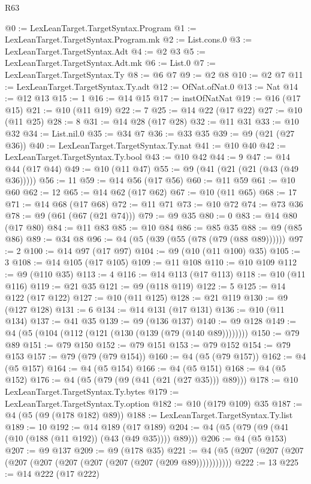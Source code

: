\begin{lexlean}{R63}
\begin{coremodule}
@0 := LexLeanTarget.TargetSyntax.Program
@1 := LexLeanTarget.TargetSyntax.Program.mk
@2 := List.cons.{0}
@3 := LexLeanTarget.TargetSyntax.Adt
@4 := @2 @3
@5 := LexLeanTarget.TargetSyntax.Adt.mk
@6 := List.{0}
@7 := LexLeanTarget.TargetSyntax.Ty
@8 := @6 @7
@9 := @2 @8
@10 := @2 @7
@11 := LexLeanTarget.TargetSyntax.Ty.adt
@12 := OfNat.ofNat.{0}
@13 := Nat
@14 := @12 @13
@15 := 1
@16 := @14 @15
@17 := instOfNatNat
@19 := @16 (@17 @15)
@21 := @10 (@11 @19)
@22 := 7
@25 := @14 @22 (@17 @22)
@27 := @10 (@11 @25)
@28 := 8
@31 := @14 @28 (@17 @28)
@32 := @11 @31
@33 := @10 @32
@34 := List.nil.{0}
@35 := @34 @7
@36 := @33 @35
@39 := @9 (@21 (@27 @36))
@40 := LexLeanTarget.TargetSyntax.Ty.nat
@41 := @10 @40
@42 := LexLeanTarget.TargetSyntax.Ty.bool
@43 := @10 @42
@44 := 9
@47 := @14 @44 (@17 @44)
@49 := @10 (@11 @47)
@55 := @9 (@41 (@21 (@21 (@43 (@49 @36)))))
@56 := 11
@59 := @14 @56 (@17 @56)
@60 := @11 @59
@61 := @10 @60
@62 := 12
@65 := @14 @62 (@17 @62)
@67 := @10 (@11 @65)
@68 := 17
@71 := @14 @68 (@17 @68)
@72 := @11 @71
@73 := @10 @72
@74 := @73 @36
@78 := @9 (@61 (@67 (@21 @74)))
@79 := @9 @35
@80 := 0
@83 := @14 @80 (@17 @80)
@84 := @11 @83
@85 := @10 @84
@86 := @85 @35
@88 := @9 (@85 @86)
@89 := @34 @8
@96 := @4 (@5 (@39 (@55 (@78 (@79 (@88 @89))))))
@97 := 2
@100 := @14 @97 (@17 @97)
@104 := @9 (@10 (@11 @100) @35)
@105 := 3
@108 := @14 @105 (@17 @105)
@109 := @11 @108
@110 := @10 @109
@112 := @9 (@110 @35)
@113 := 4
@116 := @14 @113 (@17 @113)
@118 := @10 (@11 @116)
@119 := @21 @35
@121 := @9 (@118 @119)
@122 := 5
@125 := @14 @122 (@17 @122)
@127 := @10 (@11 @125)
@128 := @21 @119
@130 := @9 (@127 @128)
@131 := 6
@134 := @14 @131 (@17 @131)
@136 := @10 (@11 @134)
@137 := @41 @35
@139 := @9 (@136 @137)
@140 := @9 @128
@149 := @4 (@5 (@104 (@112 (@121 (@130 (@139 (@79 (@140 @89))))))))
@150 := @79 @89
@151 := @79 @150
@152 := @79 @151
@153 := @79 @152
@154 := @79 @153
@157 := @79 (@79 (@79 @154))
@160 := @4 (@5 (@79 @157))
@162 := @4 (@5 @157)
@164 := @4 (@5 @154)
@166 := @4 (@5 @151)
@168 := @4 (@5 @152)
@176 := @4 (@5 (@79 (@9 (@41 (@21 (@27 @35))) @89)))
@178 := @10 LexLeanTarget.TargetSyntax.Ty.bytes
@179 := LexLeanTarget.TargetSyntax.Ty.option
@182 := @10 (@179 @109) @35
@187 := @4 (@5 (@9 (@178 @182) @89))
@188 := LexLeanTarget.TargetSyntax.Ty.list
@189 := 10
@192 := @14 @189 (@17 @189)
@204 := @4 (@5 (@79 (@9 (@41 (@10 (@188 (@11 @192)) (@43 (@49 @35)))) @89)))
@206 := @4 (@5 @153)
@207 := @9 @137
@209 := @9 (@178 @35)
@221 := @4 (@5 (@207 (@207 (@207 (@207 (@207 (@207 (@207 (@207 (@207 (@209 @89)))))))))))
@222 := 13
@225 := @14 @222 (@17 @222)

\end{coremodule}
\end{lexlean}
